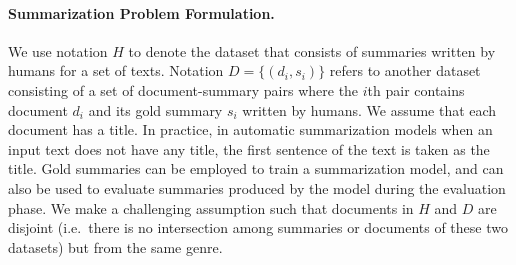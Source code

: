 
\paragraph{Summarization Problem Formulation.}
We use notation $H$ to denote the dataset that consists of summaries written by humans for a set of texts.  
Notation \mbox{$D=\lbrace \left( d_i, s_i \right) \rbrace$} refers to another dataset consisting of a set of document-summary pairs where the $i$th pair contains document $d_i$ and  its gold summary $s_i$ written by humans.  
We assume that each document has a title. 
In practice, in automatic summarization models when an input text does not have any title, the first sentence of the text is taken as the title. 
Gold summaries can be employed to train a summarization model, and can also be used to evaluate summaries produced by the model during the evaluation phase. 
We make a challenging assumption such that documents in $H$ and $D$ are disjoint (i.e.\ there is no intersection among summaries or documents of these two datasets) but from the same genre. 

